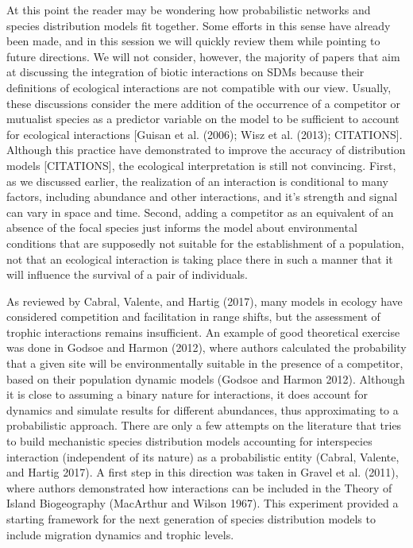 \documentclass[11pt]{article}
\begin{document}
At this point the reader may be wondering how probabilistic networks and
species distribution models fit together. Some efforts in this sense
have already been made, and in this session we will quickly review them
while pointing to future directions. We will not consider, however, the
majority of papers that aim at discussing the integration of biotic
interactions on SDMs because their definitions of ecological
interactions are not compatible with our view. Usually, these
discussions consider the mere addition of the occurrence of a competitor
or mutualist species as a predictor variable on the model to be
sufficient to account for ecological interactions {[}Guisan et al.
(2006); Wisz et al. (2013); CITATIONS{]}. Although this practice have
demonstrated to improve the accuracy of distribution models
{[}CITATIONS{]}, the ecological interpretation is still not convincing.
First, as we discussed earlier, the realization of an interaction is
conditional to many factors, including abundance and other interactions,
and it's strength and signal can vary in space and time. Second, adding
a competitor as an equivalent of an absence of the focal species just
informs the model about environmental conditions that are supposedly not
suitable for the establishment of a population, not that an ecological
interaction is taking place there in such a manner that it will
influence the survival of a pair of individuals.

As reviewed by Cabral, Valente, and Hartig (2017), many models in
ecology have considered competition and facilitation in range shifts,
but the assessment of trophic interactions remains insufficient. An
example of good theoretical exercise was done in Godsoe and Harmon
(2012), where authors calculated the probability that a given site will
be environmentally suitable in the presence of a competitor, based on
their population dynamic models (Godsoe and Harmon 2012). Although it is
close to assuming a binary nature for interactions, it does account for
dynamics and simulate results for different abundances, thus
approximating to a probabilistic approach. There are only a few attempts
on the literature that tries to build mechanistic species distribution
models accounting for interspecies interaction (independent of its
nature) as a probabilistic entity (Cabral, Valente, and Hartig 2017). A
first step in this direction was taken in Gravel et al. (2011), where
authors demonstrated how interactions can be included in the Theory of
Island Biogeography (MacArthur and Wilson 1967). This experiment
provided a starting framework for the next generation of species
distribution models to include migration dynamics and trophic levels.
\end{document}
